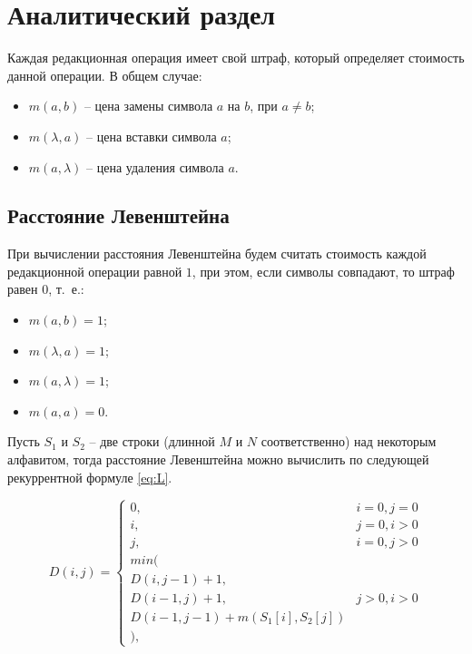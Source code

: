\chapter{Аналитический раздел}

Каждая редакционная операция имеет свой штраф, который определяет стоимость данной операции. В общем случае:
\begin{itemize}
	\item $ m(a, b) $ -- цена замены символа $ a $ на $ b $, при $ a \ne b $;
	\item $ m(\lambda, a) $ -- цена вставки символа $ a $;
	\item $ m(a, \lambda) $ -- цена удаления символа $ a $.
\end{itemize}


\section{Расстояние Левенштейна}

При вычислении расстояния Левенштейна будем считать стоимость каждой редакционной операции равной $ 1 $, при этом, если символы совпадают, то штраф равен $0$, т.~е.:
\begin{itemize}
	\item $ m(a, b) = 1 $;
	\item $ m(\lambda, a) = 1 $;
	\item $ m(a, \lambda) = 1 $;
	\item $ m(a, a) = 0 $.
\end{itemize}

Пусть $S_1$ и $S_2$ -- две строки (длинной $M$ и $N$ соответственно) над некоторым алфавитом, тогда расстояние Левенштейна можно вычислить по следующей рекуррентной формуле \eqref{eq:L}.

\begin{equation}
	\label{eq:L}
	D(i,j) = \left\{ \begin{array}{ll}
		0, & \textrm{$i = 0, j = 0$}\\
		i, & \textrm{$j = 0, i > 0$}\\
		j, & \textrm{$i = 0, j > 0$}\\
		min(\\
		D(i,j-1)+1,\\
		D(i-1, j) +1, &\textrm{$j>0, i>0$}\\
		D(i-1, j-1) + m(S_{1}[i], S_{2}[j])\\
		),
	\end{array} \right.
\end{equation}

